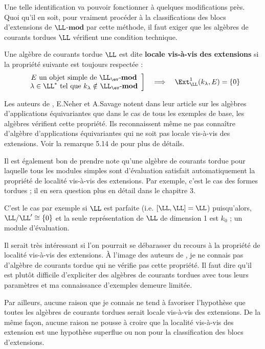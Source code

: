 Une telle identification va pouvoir fonctionner à quelques modifications près. Quoi qu'il en soit, pour vraiment procéder à la classifications des blocs d'extensions de $\LL$-$\mathbf{mod}$ par cette méthode, il faut exiger que les algèbres de courants tordues $\LL$ vérifient une condition technique. 

\begin{Def} \label{extlocal} Une algèbre de courants tordue $\LL$ est dite \textbf{locale vis-à-vis des extensions} si la propriété suivante est toujours respectée :
$$ \left.\begin{array}{c} E \text{ un objet simple de $\LL_{\ev}$-$\mathbf{mod}$} \\ \lambda \in \LL^* \text{ tel que $k_\lambda \notin$ $\LL_{\ev}$-$\mathbf{mod}$}\end{array}\right] \quad \Longrightarrow \quad \Ext^1_\LL(k_\lambda,E) = \{0\} $$
\end{Def}

\begin{Rem} Les auteurs de \cite{NSext}, E.Neher et A.Savage notent dans leur article sur les algèbres d'applications équivariantes que dans le cas de tous les exemples de base, les algèbres vérifient cette propriété. Ils reconnaissent même ne pas connaître d'algèbre d'applications équivariantes qui ne soit pas locale vis-à-vis des extensions. Voir la remarque 5.14 de \cite{NSext} pour plus de détails.
\end{Rem}

\begin{Rem} \label{parfaiteextlocal} Il est également bon de prendre note qu'une algèbre de courants tordue pour laquelle tous les modules simples sont d'évaluation satisfait automatiquement la propriété de localité vis-à-vis des extensions. Par exemple, c'est le cas des formes tordues ; il en sera question plus en détail dans le chapitre 3.

C'est le cas par exemple si $\LL$ est parfaite (i.e. $[\LL,\LL] = \LL$) puisqu'alors, $\LL/\LL' \cong \{0\}$ et la seule représentation de $\LL$ de dimension 1 est $k_0$ ; un module d'évaluation.
\end{Rem}

\begin{Rem} Il serait très intéressant si l'on pourrait se débarasser du recours à la propriété de localité vis-à-vis des extensions. À l'image des auteurs de \cite{NSext}, je ne connais pas d'algèbre de courants tordue qui ne vérifie pas cette propriété. Il faut dire qu'il est plutôt difficile d'expliciter des algèbres de courants tordues avec tous leurs paramètres et ma connaissance d'exemples demeure limitée. 

Par ailleurs, aucune raison que je connais ne tend à favoriser l'hypothèse que toutes les algèbres de courants tordues serait locale vis-à-vis des extensions. De la même façon, aucune raison ne pousse à croire que la localité vis-à-vis des extension est une hypothèse superflue ou non pour la classification des blocs d'extensions.
\end{Rem}

